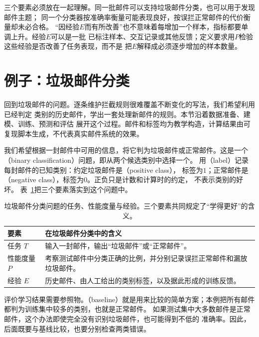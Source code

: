 三个要素必须放在一起理解。同一批邮件可以支持垃圾邮件分类，也可以用于发现邮件主题；
同一个分类器按准确率衡量可能表现良好，按误拦正常邮件的代价衡量却未必合格。
“因经验$E$而有所改善”也不意味着每增加一个样本，指标都要单调上升。经验$E$可以是一批
已标注样本、交互记录或其他反馈；定义要求用$P$检验这些经验是否改善了任务表现，而不是
把$E$解释成必须逐步增加的样本数量。

\section{例子：垃圾邮件分类}
\label{sec:spam-classification-example}

回到垃圾邮件的问题。逐条维护拦截规则很难覆盖不断变化的写法，我们希望利用已经判定
类别的历史邮件，学出一套处理新邮件的规则。本节沿着数据准备、建模、训练、预测和评估
展开这个过程。邮件和标签均为教学构造，计算结果由可复现脚本生成，不代表真实邮件系统的效果。

我们希望根据一封邮件中可用的信息，将它判为垃圾邮件或正常邮件。这是一个
（binary classification）问题，即从两个候选类别中选择一个。
用（label）记录每封邮件的已知类别：约定垃圾邮件是（positive class），
标签为$1$；正常邮件是（negative class），标签为$0$。正负只是计数和计算时的约定，
不表示类别的好坏。
表~\ref{tab:spam-three-elements}把三个要素落实到这个问题中。

\begin{table}[htbp]
  \centering
  \small
  \begin{tabularx}{\linewidth}{@{}lX@{}}
    \toprule
    \textbf{要素} & \textbf{在垃圾邮件分类中的含义} \\
    \midrule
    任务 $T$ & 输入一封邮件，输出“垃圾邮件”或“正常邮件”。 \\
    性能度量 $P$ & 考察测试邮件中分类正确的比例，并分别记录误拦正常邮件和漏放垃圾邮件。 \\
    经验 $E$ & 历史邮件、由人工给出的类别标签，以及据此形成的训练反馈。 \\
    \bottomrule
  \end{tabularx}
  \caption{垃圾邮件分类问题的任务、性能度量与经验。三个要素共同规定了“学得更好”的含义。}
  \label{tab:spam-three-elements}
\end{table}

评价学习结果需要参照物。（baseline）就是用来比较的简单方案；本例把所有邮件
都判为训练集中较多的类别，也就是正常邮件。
如果测试集中大多数邮件是正常邮件，这个办法即使完全没有识别垃圾邮件，也可能得到不低的
准确率。因此，后面既要与基线比较，也要分别检查两类错误。

